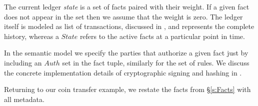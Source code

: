 The current ledger \emph{state} is a set of facts paired with their weight. If a given fact does not appear in the set then we assume that the weight is zero. The ledger itself is modeled as list of transactions, discussed in \REF, and represents the complete history, whereas a $State$ refers to the active facts at a particular point in time.

In the semantic model we specify the parties that authorize a given fact just by including an $Auth$ set in the fact tuple, similarly for the set of rules. We discuss the concrete implementation details of cryptographic signing and hashing in \REF.

Returning to our coin transfer example, we restate the facts from \S\ref{s:Facts} with all metadata.
